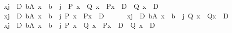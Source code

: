 \begin{isabellebody}
\ \ {\isasymforall}x{\isachardot}{\kern0pt}{\isacharparenleft}{\kern0pt}{\isasymforall}j{\isasymin}{\isacharbraceleft}{\kern0pt}{}\ {\isachardot}{\kern0pt}{\isachardot}{\kern0pt}\ D{\isacharbraceright}{\kern0pt}{\isachardot}{\kern0pt}\ {\isasymforall}b{\isasymin}A{\isachardot}{\kern0pt}\ x\ {\isasymnoteq}\ b\ {\isacharminus}{\kern0pt}\ j{\isacharparenright}{\kern0pt}\ {\isasymlongrightarrow}\ {\isacharparenleft}{\kern0pt}P\ x\ {\isasymand}\ Q\ x{\isacharparenright}{\kern0pt}\ {\isasymlongrightarrow}\ {\isacharparenleft}{\kern0pt}P{\isacharparenleft}{\kern0pt}x\ {\isacharplus}{\kern0pt}\ D{\isacharparenright}{\kern0pt}\ {\isasymand}\ Q\ {\isacharparenleft}{\kern0pt}x\ {\isacharplus}{\kern0pt}\ D{\isacharparenright}{\kern0pt}{\isacharparenright}{\kern0pt}{\isachardoublequoteclose}\isanewline
\ \ {\isachardoublequoteopen}{\isasymlbrakk}{\isasymforall}x{\isachardot}{\kern0pt}{\isacharparenleft}{\kern0pt}{\isasymforall}j{\isasymin}{\isacharbraceleft}{\kern0pt}{}\ {\isachardot}{\kern0pt}{\isachardot}{\kern0pt}\ D{\isacharbraceright}{\kern0pt}{\isachardot}{\kern0pt}\ {\isasymforall}b{\isasymin}A{\isachardot}{\kern0pt}\ x\ {\isasymnoteq}\ b\ {\isacharminus}{\kern0pt}\ j{\isacharparenright}{\kern0pt}{\isasymlongrightarrow}\ P\ x\ {\isasymlongrightarrow}\ P{\isacharparenleft}{\kern0pt}x\ {\isacharplus}{\kern0pt}\ D{\isacharparenright}{\kern0pt}\ {\isacharsemicolon}{\kern0pt}\isanewline
\ \ \ \ \ {\isasymforall}x{\isachardot}{\kern0pt}{\isacharparenleft}{\kern0pt}{\isasymforall}j{\isasymin}{\isacharbraceleft}{\kern0pt}{}\ {\isachardot}{\kern0pt}{\isachardot}{\kern0pt}\ D{\isacharbraceright}{\kern0pt}{\isachardot}{\kern0pt}\ {\isasymforall}b{\isasymin}A{\isachardot}{\kern0pt}\ x\ {\isasymnoteq}\ b\ {\isacharminus}{\kern0pt}\ j{\isacharparenright}{\kern0pt}{\isasymlongrightarrow}\ Q\ x\ {\isasymlongrightarrow}\ Q{\isacharparenleft}{\kern0pt}x\ {\isacharplus}{\kern0pt}\ D{\isacharparenright}{\kern0pt}{\isasymrbrakk}\ {\isasymLongrightarrow}\ \isanewline
\ \ {\isasymforall}x{\isachardot}{\kern0pt}{\isacharparenleft}{\kern0pt}{\isasymforall}j{\isasymin}{\isacharbraceleft}{\kern0pt}{}\ {\isachardot}{\kern0pt}{\isachardot}{\kern0pt}\ D{\isacharbraceright}{\kern0pt}{\isachardot}{\kern0pt}\ {\isasymforall}b{\isasymin}A{\isachardot}{\kern0pt}\ x\ {\isasymnoteq}\ b\ {\isacharminus}{\kern0pt}\ j{\isacharparenright}{\kern0pt}{\isasymlongrightarrow}\ {\isacharparenleft}{\kern0pt}P\ x\ {\isasymor}\ Q\ x{\isacharparenright}{\kern0pt}\ {\isasymlongrightarrow}\ {\isacharparenleft}{\kern0pt}P{\isacharparenleft}{\kern0pt}x\ {\isacharplus}{\kern0pt}\ D{\isacharparenright}{\kern0pt}\ {\isasymor}\ Q\ {\isacharparenleft}{\kern0pt}x\ {\isacharplus}{\kern0pt}\ D{\isacharparenright}{\kern0pt}{\isacharparenright}{\kern0pt}{\isachardoublequoteclose}\isanewline

\end{isabellebody}
